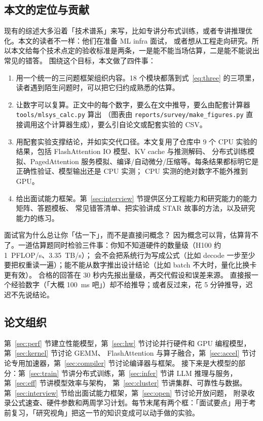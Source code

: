 \subsection{本文的定位与贡献}

现有的综述大多沿着「技术谱系」来写，比如专讲分布式训练，或者专讲推理优化。本文的读者不一样：他们在准备 ML infra 面试，
或者想从工程走向研究。所以本文给每个技术点定的验收标准是两条，一是能不能当场估算，二是能不能说出常见的错答。
围绕这个目标，本文做了四件事：
\begin{enumerate}
\item 用一个统一的三问题框架组织内容。18 个模块都落到式~\eqref{eq:three} 的三项里，读者遇到陌生问题时，可以把它归约成熟悉的估算。
\item 让数字可以复算。正文中的每个数字，要么在文中推导，要么由配套计算器 \texttt{tools/mlsys\_calc.py} 算出
（图表由 \texttt{reports/survey/make\_figures.py} 直接调用这个计算器生成），要么引自论文或配套实验的 CSV。
\item 用配套实验支撑结论，并如实交代口径。本文复用了仓库中 9 个 CPU 实验的结果，包括 FlashAttention IO 模型、KV cache 与推测解码、
分布式训练模拟、PagedAttention 服务模拟、编译/自动微分/压缩等。每条结果都标明它是正确性验证、模型输出还是 CPU 实测；
CPU 实测的绝对数字不能外推到 GPU。
\item 给出面试能力框架。第~\ref{sec:interview} 节提供区分工程能力和研究能力的能力矩阵、答题模板、
常见错答清单、把实验讲成 STAR 故事的方法，以及研究能力的练习。
\end{enumerate}

\begin{qa}{面试官为什么总让你「估一下」，而不是直接问概念？}
\ans 因为概念可以背，估算背不了。一道估算题同时检验三件事：你知不知道硬件的数量级（H100 约 1~PFLOP/s、3.35~TB/s）；
会不会把系统行为写成公式（比如 decode 一步至少要把权重读一遍）；能不能从数字推出设计结论（比如 batch 不大时，量化比换卡更有效）。
合格的回答在 30 秒内先报出量级，再交代假设和误差来源。
\wrong 直接报一个经验数字（「大概 100~ms 吧」）却不给推导；或者反过来，花 5 分钟推导，迟迟不先说结论。
\end{qa}

\subsection{论文组织}

第~\ref{sec:perf} 节建立性能模型，第~\ref{sec:hw} 节讨论并行硬件和 GPU 编程模型，第~\ref{sec:kernel} 节讨论 GEMM、
FlashAttention 与算子融合，第~\ref{sec:accel} 节讨论专用加速器，第~\ref{sec:compiler} 节讨论编译器与框架。
接下来是大模型的部分：第~\ref{sec:train} 节讲分布式训练，第~\ref{sec:infer} 节讲 LLM 推理与服务，第~\ref{sec:eff} 节讲模型效率与架构，
第~\ref{sec:cluster} 节讲集群、可靠性与数据。第~\ref{sec:interview} 节给出面试能力框架，第~\ref{sec:open} 节讨论开放问题，
附录收录公式速查、硬件参数和两周学习计划。每节末尾有两个框：「面试要点」用于考前复习，「研究视角」把这一节的知识变成可以动手做的实验。
